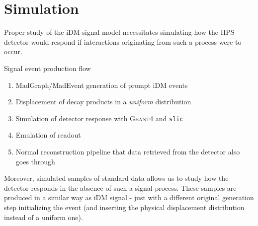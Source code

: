 \chapter{Simulation}
\label{chapter:hps:simulation}

Proper study of the iDM signal model necessitates simulating how the HPS detector
would respond if interactions originating from such a process were to occur.

Signal event production flow
\begin{enumerate}
    \item {\sc MadGraph/MadEvent} generation of prompt iDM events
    \item Displacement of decay products in a \emph{uniform} distribution
    \item Simulation of detector response with \textsc{Geant}4 and \texttt{slic}
    \item Emulation of readout
    \item Normal reconstruction pipeline that data retrieved from the detector
          also goes through
\end{enumerate}

Moreover, simulated samples of standard data allows us to study how the detector
responds in the absence of such a signal process. These samples are produced in
a similar way as iDM signal - just with a different original generation step
initializing the event (and inserting the physical displacement distribution
instead of a uniform one).

